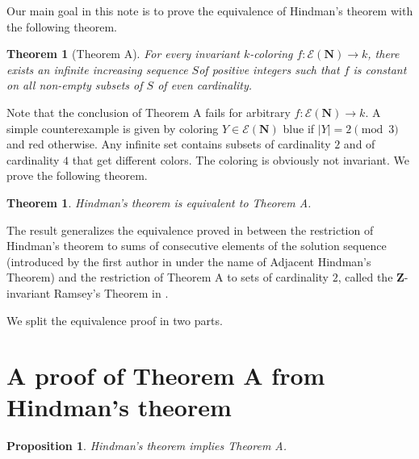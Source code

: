 \documentclass[10pt,a4paper]{amsart}
\newcommand{\Nat}{\mathbf{N}}
\newtheorem*{theorem*}{Theorem}
\newtheorem{theorem}{Theorem}[section]
\newtheorem{proposition}{Proposition}[section]
\theoremstyle{definition}
\begin{document}

Our main goal in this note is to prove the equivalence of Hindman's theorem with the following theorem.

\begin{theorem*}[Theorem A]
For every invariant $k$-coloring $f:\mathcal{E}(\Nat)\rightarrow k$, there exists an infinite increasing sequence $S$of positive integers such that $f$ is constant on all non-empty subsets of $S$ of even cardinality.
\end{theorem*}

Note that the conclusion of Theorem A fails for arbitrary $f:\mathcal{E}(\Nat)\rightarrow k$. A simple counterexample is given by coloring $Y \in \mathcal{E}(\Nat)$ blue if $|Y| = 2 \pmod 3$ and red otherwise. Any infinite set contains subsets of cardinality $2$ and of cardinality $4$ that get different colors. The coloring is obviously not invariant. We prove the following theorem.


\begin{theorem}\label{thm:main}
Hindman's theorem is equivalent to Theorem A.
\end{theorem}


The result generalizes the equivalence proved in \cite{Bre:26} between the restriction of Hindman's theorem to sums of consecutive elements of the solution sequence (introduced by the first author in \cite{Car:18:weak} under the name of Adjacent Hindman's Theorem) and the restriction of Theorem A to sets of cardinality $2$, called the $\mathbf{Z}$-invariant Ramsey's Theorem in \cite{Bre:26}.

We split the equivalence proof in two parts. 

\section{A proof of Theorem A from Hindman's theorem}

\begin{proposition}
Hindman's theorem implies Theorem A.
\end{proposition}
\end{document}
